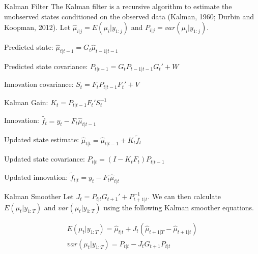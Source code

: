 \documentclass[
  ignorenonframetext,
]{beamer}
\begin{document}
\begin{frame}{Kalman Filter}
\protect\hypertarget{kalman-filter}{}
The Kalman filter is a recursive algorithm to estimate the unobserved
states conditioned on the observed data (Kalman, 1960; Durbin and
Koopman, 2012). Let \(\hat \mu_{i|j} = E(\mu_i|y_{1:j})\) and
\(P_{i|j} = var(\mu_i|y_{1:j})\).

Predicted state: \(\hat \mu_{t|t-1} = G_t \hat \mu_{t-1|t-1}\)

Predicted state covariance: \(P_{t|t-1} = G_tP_{t-1|t-1}G_t' + W\)

Innovation covariance: \(S_t = F_tP_{t|t-1}F_t' + V\)

Kalman Gain: \(K_t = P_{t|t-1}F_t'S^{-1}_t\)

Innovation: \(\tilde{f_t} = y_t - F_t \hat \mu_{t|t-1}\)

Updated state estimate:
\(\hat \mu_{t|t} = \hat \mu_{t|t-1} + K_t \tilde f_t\)

Updated state covariance: \(P_{t|t} = (I- K_tF_t)P_{t|t-1}\)

Updated innovation: \(\tilde f_{t|t} = y_t - F_t \hat \mu_{t|t}\)
\end{frame}

\begin{frame}{Kalman Smoother}
\protect\hypertarget{kalman-smoother}{}
Let \(J_t = P_{t|t} G_{t+1}' + P^{-1}_{t+1|t}\). We can then calculate
\(E(\mu_t|y_{1:T})\) and \(var(\mu_t|y_{1:T})\) using the following
Kalman smoother equations.

\begin{align*}
E(\mu_t|y_{1:T}) = \hat \mu_{t|t} + J_t (\hat \mu_{t+1|T} - \hat \mu_{t+1|t})\\
var(\mu_t|y_{1:T}) = P_{t|t} - J_t G_{t+1} P_{t|t}
\end{align*}
\end{frame}
\end{document}
